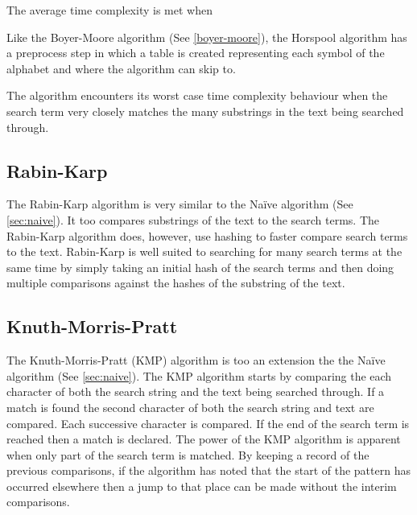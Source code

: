 \documentclass{article}
\begin{document}
The average time complexity is met when 

Like the Boyer-Moore algorithm \citep{Boyer1977} (See \ref{boyer-moore}), the Horspool algorithm has a preprocess step in which a table is created representing each symbol of the alphabet and where the algorithm can skip to.

The algorithm encounters its worst case time complexity behaviour when the search term very closely matches the many substrings in the text being searched through. 

\subsection{Rabin-Karp}

The Rabin-Karp algorithm \citep{Karp1987} is very similar to the Na{\"i}ve algorithm (See \ref{sec:naive}). It too compares substrings of the text to the search terms. The Rabin-Karp algorithm does, however, use hashing to faster compare search terms to the text. Rabin-Karp is well suited to searching for many search terms at the same time by simply taking an initial hash of the search terms and then doing multiple comparisons against the hashes of the substring of the text.

\subsection{Knuth-Morris-Pratt}

The Knuth-Morris-Pratt (KMP) algorithm \cite{Knuth1977} is too an extension the the Na{\"i}ve algorithm (See \ref{sec:naive}). The KMP algorithm starts by comparing the each character of both the search string and the text being searched through. If a match is found the second character of both the search string and text are compared. Each successive character is compared. If the end of the search term is reached then a match is declared. The power of the KMP algorithm is apparent when only part of the search term is matched. By keeping a record of the previous comparisons, if the algorithm has noted that the start of the pattern has occurred elsewhere then a jump to that place can be made without the interim comparisons.
\end{document}
